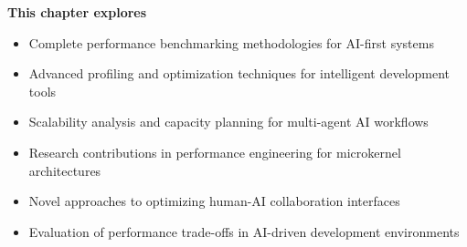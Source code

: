 \begin{tcolorbox}[
    enhanced,
    colback=white,
    colframe=brandPrimary!40,
    boxrule=1pt,
    arc=12pt,
    drop shadow={brandPrimary!20},
    left=1.5cm,
    right=1.5cm,
    top=1.2cm,
    bottom=1.2cm,
    before upper={\parindent0pt}
]
\begin{center}
{\Large\textbf{\textcolor{brandPrimary}{This chapter explores}}}
\end{center}

\vspace{0.8cm}

\begin{itemize}[leftmargin=1.2cm, itemsep=0.4cm, label={\textcolor{brandAccent}{$\triangleright$}}]
    \item {\large Complete performance benchmarking methodologies for AI-first systems}
    \item {\large Advanced profiling and optimization techniques for intelligent development tools}
    \item {\large Scalability analysis and capacity planning for multi-agent AI workflows}
    \item {\large Research contributions in performance engineering for microkernel architectures}
    \item {\large Novel approaches to optimizing human-AI collaboration interfaces}
    \item {\large Evaluation of performance trade-offs in AI-driven development environments}
\end{itemize}
\end{tcolorbox}

\clearpage
